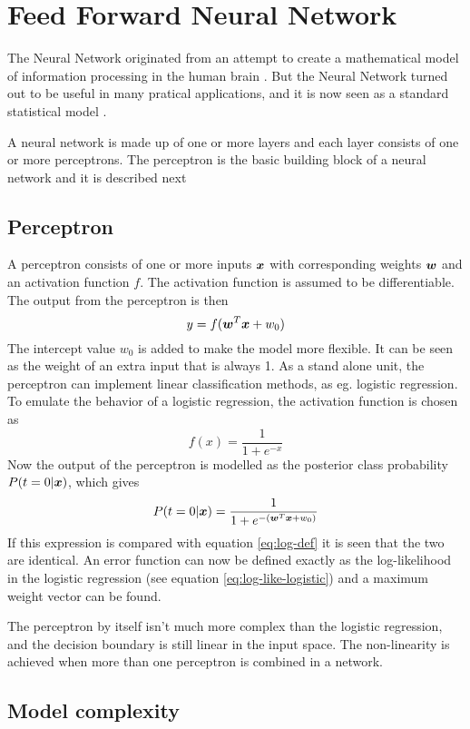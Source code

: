 \section{Feed Forward Neural Network}\label{sec:feed-forward-neural-network}
The Neural Network originated from an attempt to create a mathematical model of information processing in the human brain \citep[p.226]{bishop}. But the Neural Network turned out to be useful in many pratical applications, and it is now seen as a standard statistical model \citep[p.392]{hastie09}. \par
A neural network is made up of one or more layers and each layer consists of one or more perceptrons. The perceptron is the basic building block of a neural network and it is described next

\subsection{Perceptron}
A perceptron consists of one or more inputs $\boldsymbol{x}$ with corresponding weights $\boldsymbol{w}$ and an activation function $f$. The activation function is assumed to be differentiable. The output from the perceptron is then
\[
    y = f(\boldsymbol{w}^T\boldsymbol{x} + w_0)
\]
The intercept value $w_0$ is added to make the model more flexible. It can be seen as the weight of an extra input that is always 1.
As a stand alone unit, the perceptron can implement linear classification methods, as eg. logistic regression. To emulate the behavior of a logistic regression, the activation function is chosen as
\[
    f(x) = \frac{1}{1+e^{-x}}
\]
Now the output of the perceptron is modelled as the posterior class probability $P(t=0|\boldsymbol{x})$, which gives
\[
    P(t=0|\boldsymbol{x}) = \frac{1}{1+e^{-(\boldsymbol{w}^T\boldsymbol{x}+w_0)}}
\]
If this expression is compared with equation \eqref{eq:log-def} it is seen that the two are identical. An error function can now be defined exactly as the log-likelihood in the logistic regression (see equation \eqref{eq:log-like-logistic}) and a maximum weight vector can be found. \par
The perceptron by itself isn't much more complex than the logistic regression, and the decision boundary is still linear in the input space. The non-linearity is achieved when more than one perceptron is combined in a network.

\subsection{Model complexity}




